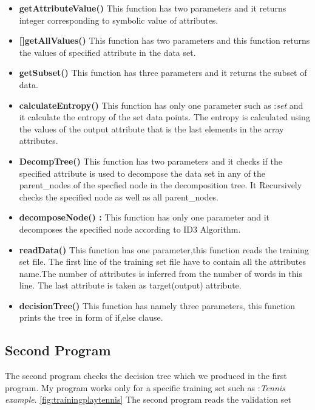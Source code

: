 \documentclass{report}
\begin{document}
\begin{itemize}

\item {\bf getAttributeValue()}  This function has two parameters and it returns integer corresponding to symbolic value of attributes.

\item {\bf []getAllValues()} This function has two parameters and this function returns the values of specified attribute in the data set.

\item {\bf getSubset()} This function has three parameters and it returns the subset of data.

\item {\bf calculateEntropy()} This function has only one parameter such as :\emph{set} and it calculate the entropy of the set data points. The entropy is calculated using the values of the output attribute that is the last elements in the array attributes. 

\item {\bf DecompTree()} This function has two parameters and it checks if the specified attribute is used to decompose the data set in any of the parent\_nodes of the specfied node in the decomposition tree. It Recursively checks the specified node as well as all parent\_nodes.

\item {\bf decomposeNode() :} This function has only one  parameter and it decomposes the specified node according to ID3 Algorithm.

\item {\bf readData()} This function has one parameter,this function reads the training set file. The first line of the training set file have to contain all the attributes name.The number of attributes is inferred from the number of words in this line. The last attribute is taken as target(output) attribute. 

\item {\bf decisionTree()} This function has namely three parameters, this function prints the tree in form of if,else clause.
\end{itemize}
 
\subsection{Second Program}
\label{sec:sp}

The second program checks the decision tree which we produced in the first program.  My program works only for a specific training set such as :\emph{Tennis example}. \ref{fig:trainingplaytennis}
The second program reads the validation set 
\end{document}
